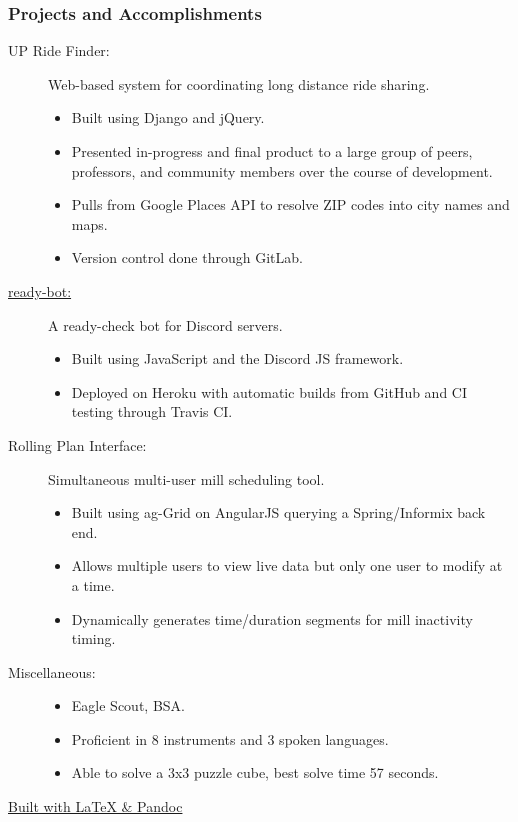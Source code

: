 \documentclass{article}
\begin{document}
\subsubsection*{Projects and Accomplishments}
    \begin{description}
        \item[UP Ride Finder:] Web-based system for coordinating long distance ride sharing.
            \begin{itemize}
                \item Built using Django and jQuery.
                \item Presented in-progress and final product to a large group of peers, professors, and community members over the course of development.
                \item Pulls from Google Places API to resolve ZIP codes into city names and maps.
                \item Version control done through GitLab.
            \end{itemize}

            \vspace{0.5em}

        \item[\href{https://www.github.com/BurnsCommaLucas/Resume}{ready-bot:}] A ready-check bot for Discord servers.
            \begin{itemize}
                \item Built using JavaScript and the Discord JS framework.
                \item Deployed on Heroku with automatic builds from GitHub and CI testing through Travis CI.
            \end{itemize}

            \vspace{0.5em}

        \item[Rolling Plan Interface:] Simultaneous multi-user mill scheduling tool.
            \begin{itemize}
                \item Built using ag-Grid on AngularJS querying a Spring/Informix back end.
                \item Allows multiple users to view live data but only one user to modify at a time.
                \item Dynamically generates time/duration segments for mill inactivity timing.
            \end{itemize}

            \vspace{0.5em}

        \item[Miscellaneous:] \hfill
            \begin{itemize}
                \item Eagle Scout, BSA.
                \item Proficient in 8 instruments and 3 spoken languages.
                \item Able to solve a 3x3 puzzle cube, best solve time 57 seconds.
        \end{itemize}
    \end{description}
    
    \begin{center}
	\vspace{.25in}
    \href{https://www.github.com/BurnsCommaLucas/Resume}{\tiny Built with \LaTeX \hspace{0.001in} \& Pandoc}
    \end{center}
\end{document}

